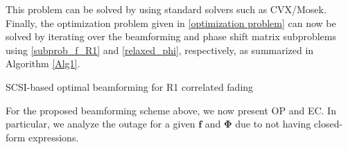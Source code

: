 \documentclass[journal,draftclsnofoot,onecolumn,12pt]{IEEEtran}
\begin{document}
This problem can be solved by using standard solvers such as CVX/Mosek. Finally, the optimization problem given in \eqref{optimization problem} can now be solved by iterating over the beamforming and phase shift matrix subproblems using \eqref{subprob_f_R1} and \eqref{relaxed_phi}, respectively, as summarized in Algorithm \ref{Alg1}.
\begin{algorithm}\label{Alg1}
\caption{SCSI-based optimal beamforming for R1 correlated fading}
\end{algorithm}
For the proposed beamforming scheme above, we now present OP and EC. In particular, we analyze the outage for a given $\mathbf{f}$ and $\mathbf{\Phi}$ due to not having closed-form expressions.
\end{document}
